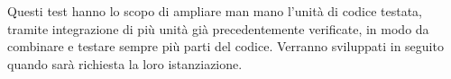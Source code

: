 Questi test hanno lo scopo di ampliare man mano l’unità di codice testata, tramite integrazione di più unità già precedentemente verificate, in modo da combinare e testare sempre più parti del codice. Verranno sviluppati in seguito quando sarà richiesta la loro istanziazione.